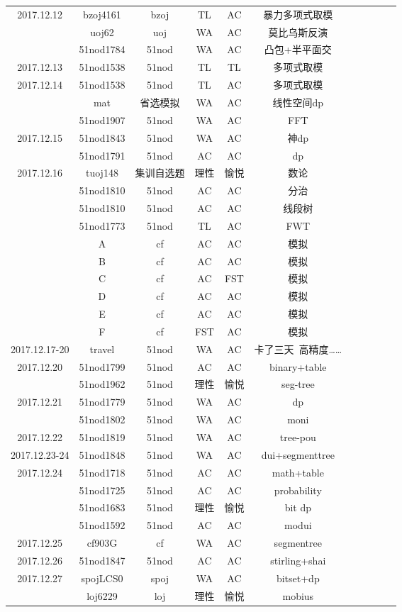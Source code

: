 \documentclass[landscape]{article}
\begin{document}
\begin{longtable}{ccccccccccc}
  \hline
  2017.12.12 & bzoj4161 & bzoj & TL & AC & 暴力多项式取模\\
  & uoj62 & uoj & WA & AC & 莫比乌斯反演\\
  & 51nod1784 & 51nod & WA & AC & 凸包+半平面交\\
  \hline
  2017.12.13 & 51nod1538 & 51nod & TL & TL & 多项式取模\\
  \hline
  2017.12.14 & 51nod1538 & 51nod & TL & AC & 多项式取模\\
  & mat & 省选模拟 & WA & AC & 线性空间dp\\
  & 51nod1907 & 51nod & WA & AC & FFT\\
  \hline
  2017.12.15 & 51nod1843 & 51nod & WA & AC & 神dp\\
  & 51nod1791 & 51nod & AC & AC & dp\\
  \hline
  2017.12.16 & tuoj148 & 集训自选题 & 理性 & 愉悦 & 数论\\
  & 51nod1810 & 51nod & AC & AC & 分治\\
  & 51nod1810 & 51nod & AC & AC & 线段树\\
  & 51nod1773 & 51nod & TL & AC & FWT\\
  & A & cf & AC & AC & 模拟\\
  & B & cf & AC & AC & 模拟\\
  & C & cf & AC & FST & 模拟\\
  & D & cf & AC & AC & 模拟\\
  & E & cf & AC & AC & 模拟\\
  & F & cf & FST & AC & 模拟\\
  \hline
  2017.12.17-20 & travel & 51nod & WA & AC & 卡了三天\ 高精度……\\
  \hline
  2017.12.20 & 51nod1799 & 51nod & AC & AC & binary+table\\
  & 51nod1962 & 51nod & 理性 & 愉悦 & seg-tree\\
  \hline
  2017.12.21 & 51nod1779 & 51nod & WA & AC & dp\\
  & 51nod1802 & 51nod & WA & AC & moni\\
  \hline
  2017.12.22 & 51nod1819 & 51nod & WA & AC & tree-pou\\
  \hline
  2017.12.23-24 & 51nod1848 & 51nod & WA & AC & dui+segmenttree\\
  \hline
  2017.12.24 & 51nod1718 & 51nod & AC & AC & math+table\\
  & 51nod1725 & 51nod & AC & AC & probability\\
  & 51nod1683 & 51nod & 理性 & 愉悦 & bit dp\\
  & 51nod1592 & 51nod & AC & AC & modui\\
  \hline
  2017.12.25 & cf903G & cf & WA & AC & segmentree\\
  \hline
  2017.12.26 & 51nod1847 & 51nod & AC & AC & stirling+shai\\
  \hline
  2017.12.27 & spojLCS0 & spoj & WA & AC & bitset+dp\\
  & loj6229 & loj & 理性 & 愉悦 & mobius\\
  \hline
\end{longtable}
\end{document}
